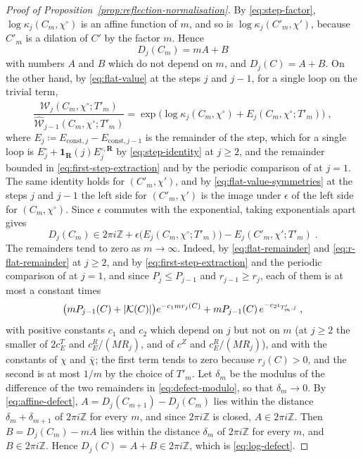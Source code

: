 \documentclass[11pt]{preprint}
\DeclarePairedDelimiter{\abs}{\lvert}{\rvert}
\numberwithin{equation}{section}
\theoremstyle{definition}
\theoremstyle{remark}
\theoremstyle{plain}
\begin{document}
\begin{proof}[Proof of Proposition~\ref{prop:reflection-normalisation}]
By \eqref{eq:step-factor}, $\log\kappa_j(C_m, \chi^\circ)$ is an affine function of $m$, and so is $\log\kappa_j(C'_m, \chi')$, because $C'_m$ is a dilation of $C'$ by the factor $m$. Hence
\begin{equation}\label{eq:affine-defect}
    D_j(C_m) = mA + B
\end{equation}
with numbers $A$ and $B$ which do not depend on $m$, and $D_j(C) = A + B$. On the other hand, by \eqref{eq:flat-value} at the steps $j$ and $j - 1$, for a single loop on the trivial term,
\begin{equation}\label{eq:flat-step-ratio}
    \frac{\widehat{\mathcal W}_j(C_m, \chi^\circ; T'_m)}{\widehat{\mathcal W}_{j-1}(C_m, \chi^\circ; T'_m)} = \exp\bigl(\log\kappa_j(C_m, \chi^\circ) + E_j(C_m, \chi^\circ; T'_m)\bigr)\;,
\end{equation}
where $E_j \coloneqq E_{\mathrm{const},j} - E_{\mathrm{const},j-1}$ is the remainder of the step, which for a single loop is $E^\circ_j + \mathbf 1_{\mathbf R}(j)E^{\circ,\mathbf R}_j$ by \eqref{eq:step-identity} at $j \geq 2$, and the remainder bounded in \eqref{eq:first-step-extraction} and by the periodic comparison of \cite[Appendix~F]{WilsonFirstStep} at $j = 1$. The same identity holds for $(C'_m, \chi')$, and by \eqref{eq:flat-value-symmetries} at the steps $j$ and $j - 1$ the left side for $(C'_m, \chi')$ is the image under $\epsilon$ of the left side for $(C_m, \chi^\circ)$. Since $\epsilon$ commutes with the exponential, taking exponentials apart gives
\begin{equation}\label{eq:defect-modulo}
    D_j(C_m) \in 2\pi i\mathbb Z + \epsilon\bigl(E_j(C_m, \chi^\circ; T'_m)\bigr) - E_j(C'_m, \chi'; T'_m)\;.
\end{equation}
The remainders tend to zero as $m \to \infty$. Indeed, by \eqref{eq:flat-remainder} and \eqref{eq:r-flat-remainder} at $j \geq 2$, and by \eqref{eq:first-step-extraction} and the periodic comparison of \cite[Appendix~F]{WilsonFirstStep} at $j = 1$, and since $P_j \leq P_{j-1}$ and $r_{j-1} \geq r_j$, each of them is at most a constant times
\begin{equation}\label{eq:dilation-remainder}
    \bigl(mP_{j-1}(C) + \abs{\mathcal K(C)}\bigr)e^{-c_1mr_j(C)} + mP_{j-1}(C)\,e^{-c_2\iota_{T'_m,j}}\;,
\end{equation}
with positive constants $c_1$ and $c_2$ which depend on $j$ but not on $m$ (at $j \geq 2$ the smaller of $2c^T_E$ and $c^R_E/(MR_j)$, and of $c^Z$ and $c^R_E/(MR_j)$), and with the constants of $\chi$ and $\bar\chi$; the first term tends to zero because $r_j(C) > 0$, and the second is at most $1/m$ by the choice of $T'_m$. Let $\delta_m$ be the modulus of the difference of the two remainders in \eqref{eq:defect-modulo}, so that $\delta_m \to 0$. By \eqref{eq:affine-defect}, $A = D_j(C_{m+1}) - D_j(C_m)$ lies within the distance $\delta_m + \delta_{m+1}$ of $2\pi i\mathbb Z$ for every $m$, and since $2\pi i\mathbb Z$ is closed, $A \in 2\pi i\mathbb Z$. Then $B = D_j(C_m) - mA$ lies within the distance $\delta_m$ of $2\pi i\mathbb Z$ for every $m$, and $B \in 2\pi i\mathbb Z$. Hence $D_j(C) = A + B \in 2\pi i\mathbb Z$, which is \eqref{eq:log-defect}.
\end{proof}
\end{document}
